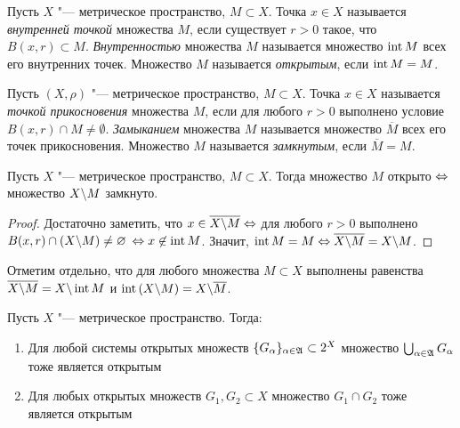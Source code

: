 \begin{definition}
	Пусть $X$ "--- метрическое пространство, $M \subset X$. Точка $x \in X$ назы\-вается \textit{внутренней точкой} множества $M$, если существует $r > 0$ такое, что $B(x, r) \subset M$. \textit{Внутренностью} множества $M$ называется множество $\operatorname{int}{M}$ всех его внутренних точек. Множество $M$ называется \textit{открытым}, если $\operatorname{int}{M} = M$.
\end{definition}

\begin{definition}
	Пусть $(X, \rho)$ "--- метрическое пространство, $M \subset X$. Точка $x \in X$ назы\-вается \textit{точкой прикосновения} множества $M$, если для любого $r > 0$ выполнено условие $B(x, r) \cap M \ne \emptyset$. \textit{Замыканием} множества $M$ называется множество $\overline M$ всех его точек прикосновения. Множество $M$ называется \textit{замкнутым}, если $\overline M = M$.
\end{definition}

\begin{theorem}\label{thm1.1}
	Пусть $X$ "--- метрическое пространство, $M \subset X$. Тогда множество $M$ открыто $\Leftrightarrow$ множество $X \backslash M$ замкнуто.
\end{theorem}

\begin{proof}
	Достаточно заметить, что $x \in \overline{X \backslash M} \Leftrightarrow$ для любого $r > 0$ выполнено $B(x, r) \cap (X \backslash M) \ne \varnothing$ $\Leftrightarrow x \not\in \operatorname{int}{M}$. Значит, $\operatorname{int} M = M\Leftrightarrow \overline{X \backslash M} = X \backslash M$.
\end{proof}

\begin{note}
	Отметим отдельно, что для любого множества $M \subset X$ выполнены равенства $\overline{X \backslash M} = X \backslash \operatorname{int} M$ и $\operatorname{int}{(X \backslash M)} = X \backslash \overline M$.
\end{note}

\begin{theorem}\label{thm1.2}
	Пусть $X$ "--- метрическое пространство. Тогда:
	\begin{enumerate}
		\item Для любой системы открытых множеств $\{G_\alpha\}_{\alpha \in \mathfrak A} \subset 2^X$ множество $\bigcup_{\alpha \in \mathfrak A} G_{\alpha}$ тоже является открытым

		\item Для любых открытых множеств $G_1, G_2 \subset X$ множество $G_1 \cap G_2$ тоже является открытым
	\end{enumerate}
\end{theorem}

